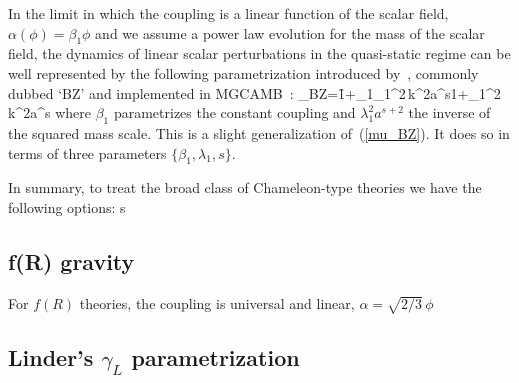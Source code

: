 In the limit in which the coupling is a linear function of the scalar field, $\alpha(\phi)=\beta_1\phi$ and we assume a power law evolution for the mass of the scalar field,  the dynamics of linear scalar perturbations in the quasi-static regime can be well represented  by the following parametrization introduced by~\cite{Bertschinger:2008zb}, commonly dubbed `BZ' and implemented in MGCAMB~\cite{Hojjati:2011ix,MGCAMB}:
\be\label{mu_BZ_gen}
\mu_{\rm BZ}=\f{1+\beta_1\lambda_1^2\,k^2a^s}{1+\lambda_1^2\,k^2a^s}
\ee
where $\beta_1$ parametrizes the constant coupling and $\lambda_1^2 a^{s+2}$ the inverse of the squared mass scale. This is a slight generalization of~(\ref{mu_BZ}). It does so in terms of three parameters $\{\beta_1,\lambda_1,s\}$. 

In summary, to treat the broad class of Chameleon-type theories we have the following options:
s

\subsection{f(R) gravity}
For $f(R)$ theories, the coupling is universal and linear, $\alpha=\sqrt{2/3}\,\phi$
\subsection{Linder's $\gamma_L$ parametrization}


